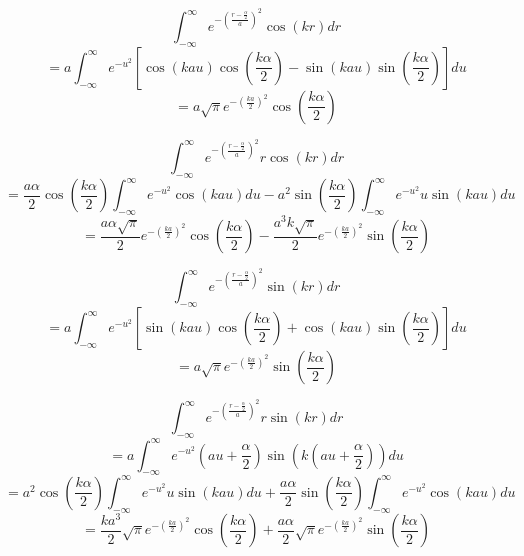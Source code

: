 \documentclass[double,12pt]{beavtex}
\begin{document}
\begin{equation}{\int_{-\infty}^{\infty}{e^{-\left(\frac{r-\frac{\alpha}{2}}{a}\right)^2}\cos(kr)d{r}}}\end{equation}
\begin{displaymath}{=a\int_{-\infty}^{\infty}{e^{-u^2}\left[\cos(kau)\cos(\frac{k\alpha}{2})-\sin(kau)\sin(\frac{k\alpha}{2})\right]d{u}}}\end{displaymath}  
\begin{equation}{=a\sqrt{\pi}e^{-\left(\frac{ka}{2}\right)^2}\cos(\frac{k\alpha}{2})}\end{equation} 

\begin{equation}{\int_{-\infty}^{\infty}{e^{-\left(\frac{r-\frac{\alpha}{2}}{a}\right)^2}r\cos(kr)d{r}}}\end{equation}
\begin{equation}{=\frac{a\alpha}{2}\cos\left(\frac{k\alpha}{2}\right)\int_{-\infty}^{\infty}{e^{-u^2}\cos(kau)d{u}} -a^2\sin\left(\frac{k\alpha}{2}\right)\int_{-\infty}^{\infty}{e^{-u^2}u\sin(kau)d{u}}}\end{equation}
\begin{equation}{=\frac{a\alpha\sqrt{\pi}}{2}e^{-\left(\frac{ka}{2}\right)^2}\cos\left(\frac{k\alpha}{2}\right)-\frac{a^3k\sqrt{\pi}}{2}e^{-\left(\frac{ka}{2}\right)^2}\sin\left(\frac{k\alpha}{2}\right)}\end{equation}

\begin{equation}{\int_{-\infty}^{\infty}{e^{-\left(\frac{r-\frac{\alpha}{2}}{a}\right)^2}\sin(kr)d{r}}}\end{equation} 
\begin{displaymath}{=a\int_{-\infty}^{\infty}{e^{-u^2}\left[\sin(kau)\cos(\frac{k\alpha}{2})+\cos(kau)\sin(\frac{k\alpha}{2})\right]d{u}}}\end{displaymath}  
\begin{equation}{=a\sqrt{\pi}e^{-\left(\frac{ka}{2}\right)^2}\sin(\frac{k\alpha}{2})}\end{equation} 

\begin{equation}{\int_{-\infty}^{\infty}{e^{-\left(\frac{r-\frac{\alpha}{2}}{a}\right)^2}r\sin(kr)d{r}}}\end{equation} 
\begin{displaymath}{=a\int_{-\infty}^{\infty}{e^{-u^2}(au+\frac{\alpha}{2})\sin(k(au+\frac{\alpha}{2}))d{u}}}\end{displaymath} 
\begin{displaymath}{=a^2\cos(\frac{k\alpha}{2})\int_{-\infty}^{\infty}{e^{-u^2}u\sin(kau)d{u} +\frac{a\alpha}{2}\sin(\frac{k\alpha}{2})\int_{-\infty}^{\infty}e^{-u^2}\cos(kau)d{u}}}\end{displaymath} 
\begin{equation}{=\frac{ka^3}{2}\sqrt{\pi}e^{-\left(\frac{ka}{2}\right)^2}\cos(\frac{k\alpha}{2})+\frac{a\alpha}{2}\sqrt{\pi}e^{-\left(\frac{ka}{2}\right)^2}\sin(\frac{k\alpha}{2})}\end{equation} 
\end{document}
